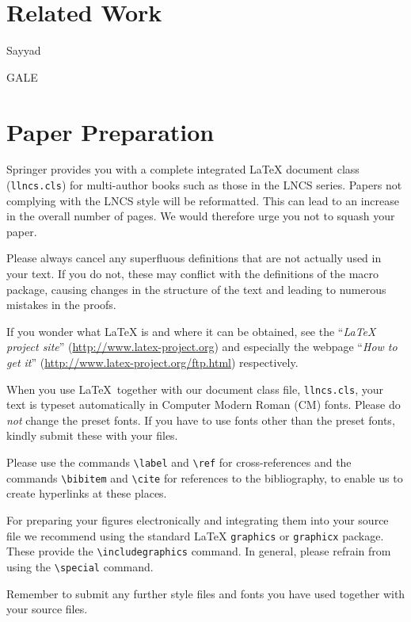 \documentclass[runningheads]{llncs}
\begin{document}
{\section{Related Work}

Sayyad

GALE




\section{Paper Preparation}

Springer
provides you with a complete integrated \LaTeX{} document class (\texttt{llncs.cls})
for multi-author books such as those in the LNCS series.
Papers not complying with the LNCS style will be reformatted. This can
lead to an increase in the overall number of pages. We would therefore
urge you not to squash your paper.

Please always cancel any superfluous definitions that are
not actually used in your text. If you do not, these may conflict with
the definitions of the macro package, causing changes in the structure
of the text and leading to numerous mistakes in the proofs.

If you wonder what \LaTeX{} is and where it can be obtained, see the
``\textit{LaTeX project site}'' (\url{http://www.latex-project.org})
and especially the webpage ``\textit{How to get it}''
(\url{http://www.latex-project.org/ftp.html}) respectively.

When you use \LaTeX\ together with our document class file,
\texttt{llncs.cls},
your text is typeset automatically in Computer Modern Roman (CM) fonts.
Please do
\emph{not} change the preset fonts. If you have to use fonts other
than the preset fonts, kindly submit these with your files.

Please use the commands \verb+\label+ and \verb+\ref+ for
cross-references and the commands \verb+\bibitem+ and \verb+\cite+ for
references to the bibliography, to enable us to create hyperlinks at
these places.

For preparing your figures electronically and integrating them into
your source file we recommend using the standard \LaTeX{} \verb+graphics+ or
\verb+graphicx+ package. These provide the \verb+\includegraphics+ command.
In general, please refrain from using the \verb+\special+ command.

Remember to submit any further style files and
fonts you have used together with your source files.

}
\end{document}
